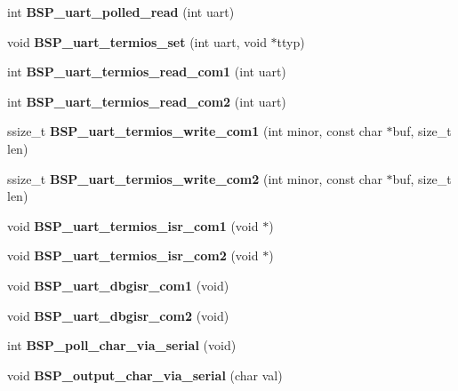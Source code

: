 \begin{DoxyCompactItemize}
int {\bfseries B\+S\+P\+\_\+uart\+\_\+polled\+\_\+read} (int uart)
\item 
\mbox{\label{group__i386__uart_ga6162321a0c54b38ce3f76d2f00079aa0}} 
void {\bfseries B\+S\+P\+\_\+uart\+\_\+termios\+\_\+set} (int uart, void $\ast$ttyp)
\item 
\mbox{\label{group__i386__uart_ga0a915c9364b23cc085210f475184f73d}} 
int {\bfseries B\+S\+P\+\_\+uart\+\_\+termios\+\_\+read\+\_\+com1} (int uart)
\item 
\mbox{\label{group__i386__uart_ga9366a68a14cb0bc66bd559d82c820214}} 
int {\bfseries B\+S\+P\+\_\+uart\+\_\+termios\+\_\+read\+\_\+com2} (int uart)
\item 
\mbox{\label{group__i386__uart_gae7ad72a888a6f7f22c30515659f43eb0}} 
ssize\+\_\+t {\bfseries B\+S\+P\+\_\+uart\+\_\+termios\+\_\+write\+\_\+com1} (int minor, const char $\ast$buf, size\+\_\+t len)
\item 
\mbox{\label{group__i386__uart_gab764cee501b1977fa889ee65d5f9c1e7}} 
ssize\+\_\+t {\bfseries B\+S\+P\+\_\+uart\+\_\+termios\+\_\+write\+\_\+com2} (int minor, const char $\ast$buf, size\+\_\+t len)
\item 
\mbox{\label{group__i386__uart_gaab8614e4e4483e5278704530901e1ec5}} 
void {\bfseries B\+S\+P\+\_\+uart\+\_\+termios\+\_\+isr\+\_\+com1} (void $\ast$)
\item 
\mbox{\label{group__i386__uart_ga3530be583a8a0094008ef914ae1ed685}} 
void {\bfseries B\+S\+P\+\_\+uart\+\_\+termios\+\_\+isr\+\_\+com2} (void $\ast$)
\item 
\mbox{\label{group__i386__uart_gaf100d2356499cf011c69880fd49833b6}} 
void {\bfseries B\+S\+P\+\_\+uart\+\_\+dbgisr\+\_\+com1} (void)
\item 
\mbox{\label{group__i386__uart_ga652af0b81fe43a38d72ee2997f014467}} 
void {\bfseries B\+S\+P\+\_\+uart\+\_\+dbgisr\+\_\+com2} (void)
\item 
\mbox{\label{group__i386__uart_gaeeab1e014299f645336b639e803d0ca7}} 
int {\bfseries B\+S\+P\+\_\+poll\+\_\+char\+\_\+via\+\_\+serial} (void)
\item 
\mbox{\label{group__i386__uart_ga927ef7eda6919bdd479bb25c61975f35}} 
void {\bfseries B\+S\+P\+\_\+output\+\_\+char\+\_\+via\+\_\+serial} (char val)
\end{DoxyCompactItemize}
